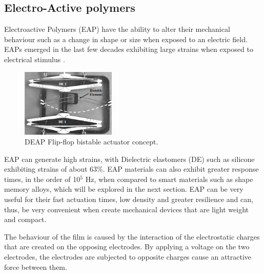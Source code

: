 \subsection{Electro-Active polymers}
Electroactive Polymers (EAP) have the ability to alter their mechanical behaviour such as a change in shape or size when exposed to an electric field. EAPs emerged in the last few decades exhibiting large strains when exposed to electrical stimulus \cite{bar-cohen_artificial_2005}.

\begin{figure}
	\centering
	\vspace{-5pt}
	\includegraphics[width=0.4\textwidth]{Figures/DEAP_flipflop.png}
	\caption{DEAP Flip-flop bistable actuator concept\cite{plante_compliant_2005}.}
	\vspace{-10pt}
	\label{fig:DEAP_flipflop}
\end{figure}

EAP can generate high strains, with Dielectric elastomers (DE) such as silicone exhibiting strains of about 63\%\cite{kornbluh_electroactive_2004}. EAP materials can also exhibit greater response times, in the order of 10$^5$ Hz, when compared to smart materials such as shape memory alloys, which will be explored in the next section. EAP can be very useful for their fast actuation times, low density and greater resilience and can, thus, be very convenient when create mechanical devices that are light weight and compact.

The behaviour of the film is caused by the interaction of the electrostatic charges that are created on the opposing electrodes. By applying a voltage on the two electrodes, the electrodes are subjected to opposite charges cause an attractive force between them.

